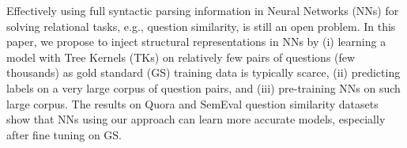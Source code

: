 Effectively using full syntactic parsing information in Neural Networks (NNs) for solving relational tasks, e.g., question similarity, is still an open problem. In this paper, we propose to inject structural representations in NNs by (i) learning a model with Tree Kernels (TKs) on relatively few pairs of questions (few thousands) as gold standard (GS) training data is typically scarce, (ii) predicting labels on a very large corpus of question pairs, and (iii)  pre-training NNs on such large corpus. The results on Quora and SemEval question similarity datasets show that NNs using our approach can learn more accurate models, especially after fine tuning on  GS.
